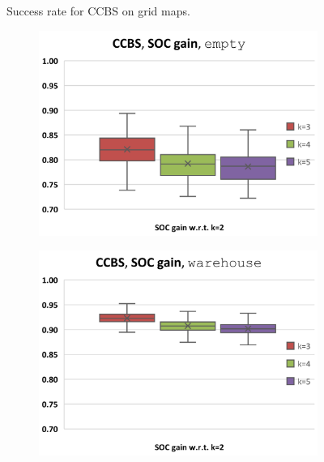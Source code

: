 \documentclass[review]{elsarticle}
\newcommand{\ccbs}{\ac{CCBS}\xspace}
\begin{document}
\begin{figure}[t]
\caption{Success rate for \ccbs on grid maps.}
\label{fig:results-ccbs-SR-grids}
\end{figure}

\begin{figure}[t]
\centering
    \begin{subfigure}
        \centering
        \includegraphics[width=0.45\linewidth]{mapfr-SOC-plot-ccbs-empty.pdf}
    \end{subfigure}\hspace{0.025\linewidth}%
    \begin{subfigure}
        \centering
        \includegraphics[width=0.45\linewidth]{mapfr-SOC-plot-ccbs-warehouse.pdf}
    \end{subfigure}%
    

\end{figure}
\end{document}
